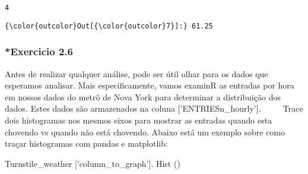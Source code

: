 \documentclass[11pt]{article}
\newenvironment{Shaded}{}{}
\newcommand{\StringTok}[1]{\textcolor[rgb]{0.25,0.44,0.63}{{#1}}}
\newcommand{\NormalTok}[1]{{#1}}
\begin{document}
    \begin{Verbatim}[commandchars=\\\{\}]
4

    \end{Verbatim}

\begin{Verbatim}[commandchars=\\\{\}]
{\color{outcolor}Out[{\color{outcolor}7}]:} 61.25
\end{Verbatim}
            
    \subsubsection{*Exercicio 2.6}\label{exercicio-2.6}

Antes de realizar qualquer análise, pode ser útil olhar para os dados
que esperamos analisar. Mais especificamente, vamos examinR as entradas
por hora em nossos dados do metrô de Nova York para determinar a
distribuição dos dados. Estes dados são armazenados na coluna
{[}'ENTRIESn\_hourly'{]}. ~~~~ Trace dois histogramas nos mesmos eixos
para mostrar as entradas quando esta chovendo vs quando não está
chovendo. Abaixo está um exemplo sobre como traçar histogramas com
pandas e matplotlib: ~~~~

\begin{Shaded}
\begin{Highlighting}[]
\NormalTok{Turnstile_weather [}\StringTok{'column_to_graph'}\NormalTok{]. Hist ()}
\end{Highlighting}
\end{Shaded}
\end{document}
